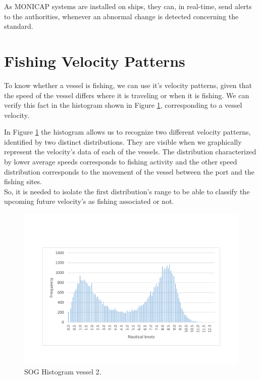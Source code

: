 As MONICAP systems are installed on ships, they can, in real-time, send alerts to the authorities, whenever an abnormal change is detected concerning the standard.


\section{Fishing Velocity Patterns} %
\label{sub:fishing_velocity_patterns}

To know whether a vessel is fishing, we can use it’s velocity patterns, given that the speed of the vessel differs where it is traveling or when it is fishing. We can verify this fact in the histogram shown in Figure \ref{fig:histogram_vessel2}, corresponding to a vessel velocity.

In Figure \ref{fig:histogram_vessel2} the histogram allows us to recognize two different velocity patterns, identified by two distinct distributions. They are visible when we graphically represent the velocity’s data of each of the vessels. The distribution characterized by lower average speeds corresponds to fishing activity and the other speed distribution corresponds to the movement of the vessel between the port and the fishing sites.\\
So, it is needed to isolate the first distribution’s range to be able to classify the upcoming future velocity’s as fishing associated or not.
 
\begin{figure}[H]
    \centering
    \includegraphics[trim=0 50 0 50, width=0.8\linewidth]{Chapters/img/hist_vessel2.pdf}
    \caption{SOG Histogram vessel 2.}
    \label{fig:histogram_vessel2}
\end{figure}


